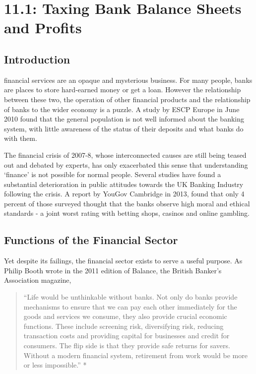 \documentclass[]{tufte-handout}
\begin{document}
\hypertarget{taxing-bank-balance-sheets-and-profits}{%
\section{11.1: Taxing Bank Balance Sheets and
Profits}\label{taxing-bank-balance-sheets-and-profits}}

\hypertarget{introduction}{%
\subsection{Introduction}\label{introduction}}

 financial services are an opaque and
mysterious business. For many people, banks are places to store
hard-earned money or get a loan. However the relationship between these
two, the operation of other financial products and the relationship of
banks to the wider economy is a puzzle. A study by ESCP Europe in June
2010 found that the general population is not well informed about the
banking system, with little awareness of the status of their deposits
and what banks do with them.

The financial crisis of 2007-8, whose interconnected causes are still
being teased out and debated by experts, has only exacerbated this sense
that understanding `finance' is not possible for normal people. Several
studies have found a substantial deterioration in public attitudes
towards the UK Banking Industry following the crisis. A report by YouGov
Cambridge in 2013, found that only 4 percent of those surveyed thought
that the banks observe high moral and ethical standards - a joint worst
rating with betting shops, casinos and online gambling.

\hypertarget{functions-of-the-financial-sector}{%
\subsection{Functions of the Financial
Sector}\label{functions-of-the-financial-sector}}

Yet despite its failings, the financial sector exists to serve a useful
purpose. As Philip Booth wrote in the 2011 edition of Balance, the
British Banker's Association magazine,

\begin{quote}
``Life would be unthinkable without banks. Not only do banks provide
mechanisms to ensure that we can pay each other immediately for the
goods and services we consume, they also provide crucial economic
functions. These include screening risk, diversifying risk, reducing
transaction costs and providing capital for businesses and credit for
consumers. The flip side is that they provide safe returns for savers.
Without a modern financial system, retirement from work would be more or
less impossible.'' *
\end{quote}
\end{document}
